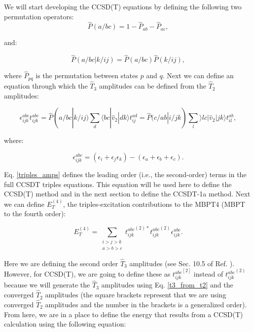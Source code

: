     We will start developing the CCSD(T) equations by defining the following two permutation operators:
    \begin{equation}
        \hat{P}(a/bc) = 1 - \hat{P}_{ab} - \hat{P}_{ac},
    \end{equation}

    and:

    \begin{equation}
        \hat{P}(a/bc | k/ij) = \hat{P}(a/bc) \hat{P}(k/ij),
    \end{equation}

    where $\hat{P}_{pq}$ is the permutation between states $p$ and $q$.  Next we can define an equation through which the $\hat{T}_3$ amplitudes can be defined from the $\hat{T}_2$ amplitudes:

    \begin{equation}\label{triples_amps}
        \epsilon_{ijk}^{abc}t_{ijk}^{abc} = \hat{P}(a/bc | k/ij) \sum_d \langle bc | \hat{v}_2 | dk \rangle t_{ij}^{ad} = \hat{P}(c/ab|i/jk)\sum_l \rangle lc | \hat{v}_2 | jk \rangle t_{il}^{ab},
    \end{equation}

    where:

    \begin{equation} \label{t3_from_t2}
         \epsilon_{ijk}^{abc} = (\epsilon_i + \epsilon_j \epsilon_k) - (\epsilon_a + \epsilon_b + \epsilon_c).
    \end{equation}

    Eq. \ref{triples_amps} defines the leading order (i.e., the second-order) terms in the full CCSDT triples equations. This equation will be used here to define the CCSD(T) method and in the next section to define the CCSDT-1a method. Next we can define $E_T^{(4)}$, the triples-excitation contributions to the MBPT4 (MBPT to the fourth order):

    \begin{equation}
        E_T^{(4)} = \sum_{\substack{i > j > k \\ a > b > c}} {t_{ijk}^{abc}}^{(2)*}{t_{ijk}^{abc}}^{(2)}\epsilon^{abc}_{ijk}.
    \end{equation}

    Here we are defining the second order $\hat{T}_3$ amplitudes (see Sec. 10.5 of Ref. \cite{Ref21}). However, for CCSD(T), we are going to define these as ${t_{ijk}^{abc}}^{[2]}$ instead of ${t_{ijk}^{abc}}^{(2)}$ because we will generate the $\hat{T}_3$ amplitudes using Eq. \ref{t3_from_t2} and the converged $\hat{T}_2$ amplitudes (the square brackets represent that we are using converged $\hat{T}_2$ amplitudes and the number in the brackets is a generalized order). From here, we are in a place to define the energy that results from a CCSD(T) calculation using the following equation:

